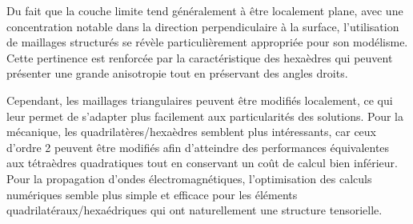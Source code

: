Du fait que la couche limite tend généralement à être localement plane, avec une concentration notable dans la direction perpendiculaire à la surface, l'utilisation de maillages structurés se révèle particulièrement appropriée pour son modélisme. Cette pertinence est renforcée par la caractéristique des hexaèdres qui peuvent présenter une grande anisotropie tout en préservant des angles droits. 


Cependant, les maillages triangulaires peuvent être modifiés localement, ce qui leur permet de s’adapter plus facilement aux particularités des solutions.
Pour la mécanique, les quadrilatères/hexaèdres semblent plus intéressants, car ceux d'ordre 2 peuvent être modifiés afin d’atteindre des performances équivalentes aux tétraèdres quadratiques tout en conservant un coût de calcul bien inférieur.
Pour la propagation d’ondes électromagnétiques, l'optimisation des calculs numériques semble plus simple et efficace pour les éléments quadrilatéraux/hexaédriques qui ont naturellement une structure tensorielle.


